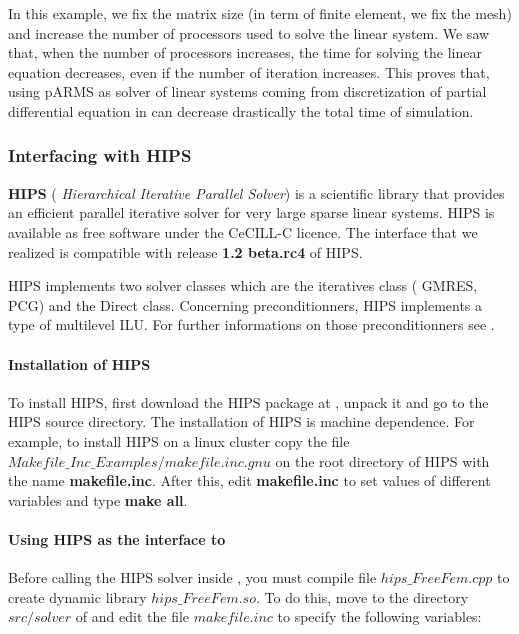 \documentclass[a4paper,twoside,12pt]{book}
\begin{document}
In this example, we fix the matrix size (in term of finite element, we fix the
mesh) and increase the number of processors
used to solve the linear system. We saw that, when the number of processors
increases, the time for solving the linear equation decreases, even if the
number of iteration increases. This proves that, using pARMS as solver of linear
systems coming from discretization of partial differential equation in \freefempp
can decrease drastically the total time of simulation.

\subsubsection{Interfacing with HIPS}
\textbf{HIPS} ( \textit{Hierarchical  Iterative Parallel Solver}) is a scientific
library
that provides an efficient parallel iterative solver for very large sparse
linear systems.
HIPS is available as free software under the CeCILL-C licence.
The interface that we realized  is compatible with release \textbf{1.2 beta.rc4}
 of HIPS.

HIPS implements two solver classes which are the iteratives class ( GMRES,  PCG)
and  the Direct class.
Concerning preconditionners, HIPS implements a type of multilevel ILU.
For further informations on those preconditionners see \cite{A:LaBRI::sisc06,
A:LaBRI::HRR07}.
\paragraph*{Installation of HIPS}
To install HIPS, first download the HIPS package at \cite{HIPS}, unpack it and
go to the HIPS source directory.
The installation of HIPS is machine dependence.
For example, to install HIPS on a  linux cluster copy the file
\textbf{$Makefile\_Inc\_Examples/makefile.inc.gnu$} on the root
 directory of HIPS with the name \textbf{makefile.inc}. After this,
edit \textbf{makefile.inc} to set values of different variables and type
\textbf{make all}.

\paragraph*{Using HIPS as the interface to \freefempp}
Before calling the HIPS solver inside \freefempp, you must
compile file $hips\_FreeFem.cpp$  to create dynamic library $hips\_FreeFem.so$.
To do this, move to the directory $src/solver$ of  \freefempp and edit the file
$makefile.inc$ to specify the following variables:\\
\end{document}
